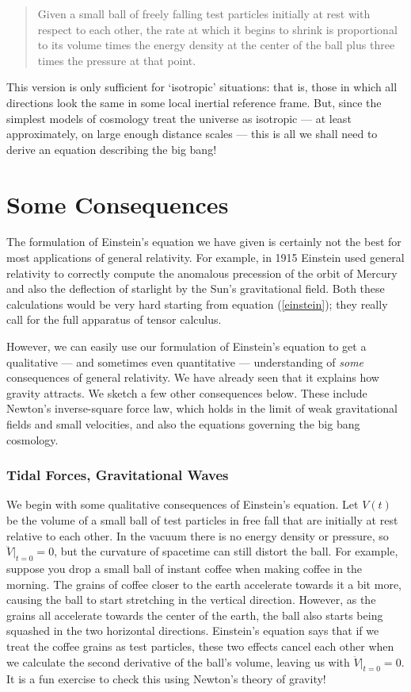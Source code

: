 \begin{quote}
Given a small ball of freely falling test particles initially at rest
with respect to each other, the rate at which it begins to shrink is
proportional to its volume times the energy density at the center of
the ball plus three times the pressure at that point.
\end{quote}

\noindent
This version is only sufficient for `isotropic' situations: that
is, those in which all directions look the same in some local inertial
reference frame.  But, since the simplest models of cosmology treat
the universe as isotropic --- at least approximately, on large enough
distance scales --- this is all we shall need to derive an equation
describing the big bang!

\section{Some Consequences}

The formulation of Einstein's equation we have given is certainly not
the best for most applications of general relativity.   For example, in
1915 Einstein used general relativity to correctly compute the 
anomalous precession of the orbit of Mercury and also the deflection of
starlight by the Sun's gravitational field.  Both these calculations
would be very hard starting from equation (\ref{einstein}); they 
really call for the full apparatus of tensor calculus.   

However, we can easily use our formulation of Einstein's equation to get a 
qualitative --- and sometimes even quantitative  --- understanding of 
{\it some} consequences of general relativity.  We have already seen that it
explains how gravity attracts.  We sketch a few other consequences below.
These include Newton's inverse-square force law,
which holds in the limit of weak gravitational fields and small velocities,
and also the equations governing the big bang cosmology.

\subsubsection*{Tidal Forces, Gravitational Waves}

We begin with some qualitative consequences of Einstein's equation.
Let $V(t)$ be the volume of a small ball of test particles in free fall
that are initially at rest relative to each other.  
In the vacuum there is no energy density or
pressure, so $\ddot V|_{t = 0} = 0$, but the curvature of spacetime can
still distort the ball.  For example, suppose you drop a small ball of
instant coffee when making coffee in the morning.   The grains of 
coffee closer to the earth accelerate towards it a bit more, causing the ball 
to start stretching in the vertical direction.  However, as the grains all
accelerate towards the center of the earth, the ball also starts
being squashed in the two horizontal directions.  Einstein's equation says
that if we treat the coffee grains as test particles, these two effects
cancel each other when we calculate the second derivative of the ball's
volume, leaving us with $\ddot V|_{t = 0} = 0$.    It is a fun exercise
to check this using Newton's theory of gravity!   

